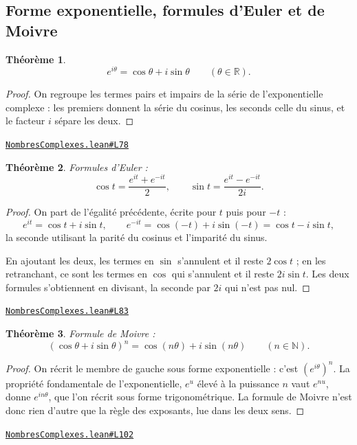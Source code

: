 \documentclass[11pt,a4paper]{article}
\theoremstyle{definition}
\theoremstyle{plain}
\newtheorem{theoreme}{Théorème}
\newcommand{\source}[2]{\par\smallskip\noindent\hfill{\footnotesize\href{#1}{\texttt{#2}}}\par\smallskip}
\begin{document}
\subsection{Forme exponentielle, formules d'Euler et de Moivre}

\begin{theoreme}
\[ e^{i\theta} = \cos\theta + i\sin\theta \qquad (\theta \in \mathbb{R}) . \]
\end{theoreme}

\begin{proof}
On regroupe les termes pairs et impairs de la série de l'exponentielle complexe : les
premiers donnent la série du cosinus, les seconds celle du sinus, et le facteur $i$ sépare
les deux.
\end{proof}
\source{https://github.com/Commutator-IO/learn-lean/blob/main/courses/02-lycee/07-nombres-complexes/NombresComplexes.lean\#L78}{NombresComplexes.lean\#L78}

\begin{theoreme}
Formules d'Euler :
\[ \cos t = \frac{e^{it} + e^{-it}}{2} , \qquad
   \sin t = \frac{e^{it} - e^{-it}}{2i} . \]
\end{theoreme}

\begin{proof}
On part de l'égalité précédente, écrite pour $t$ puis pour $-t$ :
\[ e^{it} = \cos t + i\sin t , \qquad
   e^{-it} = \cos(-t) + i\sin(-t) = \cos t - i\sin t , \]
la seconde utilisant la parité du cosinus et l'imparité du sinus.

En ajoutant les deux, les termes en $\sin$ s'annulent et il reste $2\cos t$ ; en les
retranchant, ce sont les termes en $\cos$ qui s'annulent et il reste $2i\sin t$. Les deux
formules s'obtiennent en divisant, la seconde par $2i$ qui n'est pas nul.
\end{proof}
\source{https://github.com/Commutator-IO/learn-lean/blob/main/courses/02-lycee/07-nombres-complexes/NombresComplexes.lean\#L83}{NombresComplexes.lean\#L83}

\begin{theoreme}
Formule de Moivre :
\[ (\cos\theta + i\sin\theta)^{n} = \cos(n\theta) + i\sin(n\theta) \qquad (n \in \mathbb{N}) . \]
\end{theoreme}

\begin{proof}
On récrit le membre de gauche sous forme exponentielle : c'est $(e^{i\theta})^{n}$. La
propriété fondamentale de l'exponentielle, $e^{u}$ élevé à la puissance $n$ vaut $e^{nu}$,
donne $e^{i n\theta}$, que l'on récrit sous forme trigonométrique. La formule de Moivre
n'est donc rien d'autre que la règle des exposants, lue dans les deux sens.
\end{proof}
\source{https://github.com/Commutator-IO/learn-lean/blob/main/courses/02-lycee/07-nombres-complexes/NombresComplexes.lean\#L102}{NombresComplexes.lean\#L102}
\end{document}
